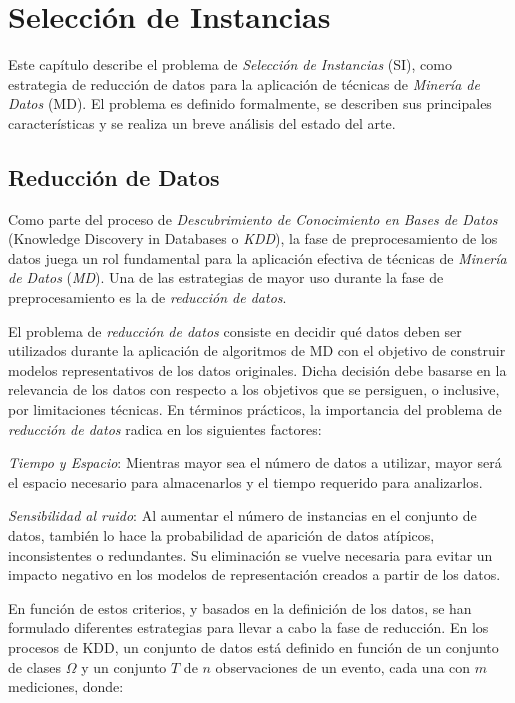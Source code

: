 \chapter{Selección de Instancias}
\label{capitulo1}

Este capítulo describe el problema de \emph{Selección de Instancias} (SI), como estrategia de reducción de datos para la aplicación de técnicas de \emph{Minería de Datos} (MD). El problema es definido formalmente, se describen sus principales características y se realiza un breve análisis del estado del arte.

\section{Reducción de Datos}

Como parte del proceso de \emph{Descubrimiento de Conocimiento en Bases de Datos} (Knowledge Discovery in Databases o \emph{KDD}), la fase de preprocesamiento de los datos juega un rol fundamental para la aplicación efectiva de técnicas de \emph{Minería de Datos} (\emph{MD}). Una de las estrategias de mayor uso durante la fase de preprocesamiento es la de \emph{reducción de datos}.

El problema de \emph{reducción de datos} consiste en decidir qué datos deben ser utilizados durante la aplicación de algoritmos de MD con el objetivo de construir modelos representativos de los datos originales. Dicha decisión debe basarse en la relevancia de los datos con respecto a los objetivos que se persiguen, o inclusive, por limitaciones técnicas. En términos prácticos, la importancia del problema de \emph{reducción de datos} radica en los siguientes factores:
\begin{inparaenum}
\item \textit{Tiempo y Espacio}: Mientras mayor sea el número de datos a utilizar, mayor será el espacio necesario para almacenarlos y el tiempo requerido para analizarlos. 
\item \textit{Sensibilidad al ruido}: Al aumentar el número de instancias en el conjunto de datos, también lo hace la probabilidad de aparición de datos atípicos, inconsistentes o redundantes. Su eliminación se vuelve necesaria para evitar un impacto negativo en los modelos de representación creados a partir de los datos.
\end{inparaenum}

En función de estos criterios, y basados en la definición de los datos, se han formulado diferentes estrategias para llevar a cabo la fase de reducción. En los procesos de KDD, un conjunto de datos está definido en función de un conjunto de clases $\Omega$ y un conjunto $T$ de $n$ observaciones de un evento, cada una con $m$ mediciones, donde:\\


